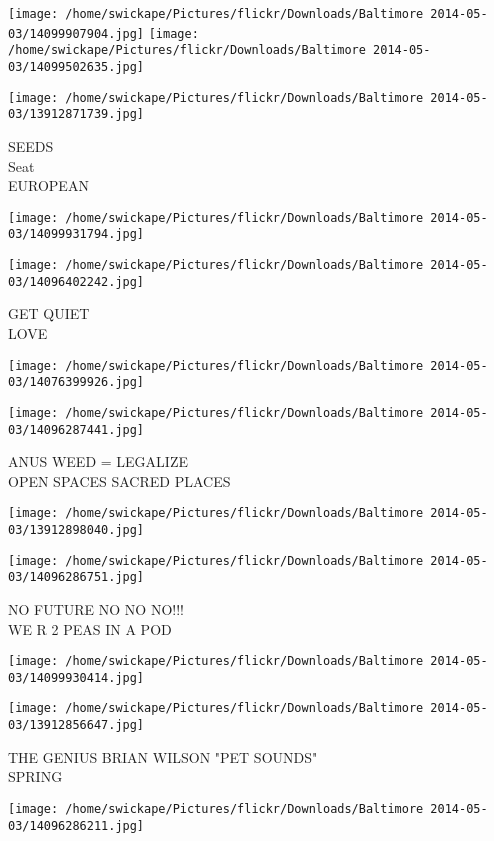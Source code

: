 \documentclass[10pt,letterpaper]{article}
\begin{document}
\texttt{[image: /home/swickape/Pictures/flickr/Downloads/Baltimore 2014-05-03/14099907904.jpg]}
\texttt{[image: /home/swickape/Pictures/flickr/Downloads/Baltimore 2014-05-03/14099502635.jpg]}

\texttt{[image: /home/swickape/Pictures/flickr/Downloads/Baltimore 2014-05-03/13912871739.jpg]}

SEEDS\\
Seat\\
EUROPEAN
\pagebreak

\texttt{[image: /home/swickape/Pictures/flickr/Downloads/Baltimore 2014-05-03/14099931794.jpg]}

\vspace{0.25in}
\texttt{[image: /home/swickape/Pictures/flickr/Downloads/Baltimore 2014-05-03/14096402242.jpg]}

GET QUIET\\
LOVE
\pagebreak

\texttt{[image: /home/swickape/Pictures/flickr/Downloads/Baltimore 2014-05-03/14076399926.jpg]}

\vspace{0.25in}
\texttt{[image: /home/swickape/Pictures/flickr/Downloads/Baltimore 2014-05-03/14096287441.jpg]}

ANUS WEED = LEGALIZE\\
OPEN SPACES SACRED PLACES
\pagebreak

\texttt{[image: /home/swickape/Pictures/flickr/Downloads/Baltimore 2014-05-03/13912898040.jpg]}

\vspace{0.25in}
\texttt{[image: /home/swickape/Pictures/flickr/Downloads/Baltimore 2014-05-03/14096286751.jpg]}

NO FUTURE NO NO NO!!!\\
WE R 2 PEAS IN A POD
\pagebreak

\texttt{[image: /home/swickape/Pictures/flickr/Downloads/Baltimore 2014-05-03/14099930414.jpg]}

\vspace{0.25in}
\texttt{[image: /home/swickape/Pictures/flickr/Downloads/Baltimore 2014-05-03/13912856647.jpg]}

THE GENIUS BRIAN WILSON "PET SOUNDS"\\
SPRING
\pagebreak

\texttt{[image: /home/swickape/Pictures/flickr/Downloads/Baltimore 2014-05-03/14096286211.jpg]}
\end{document}
